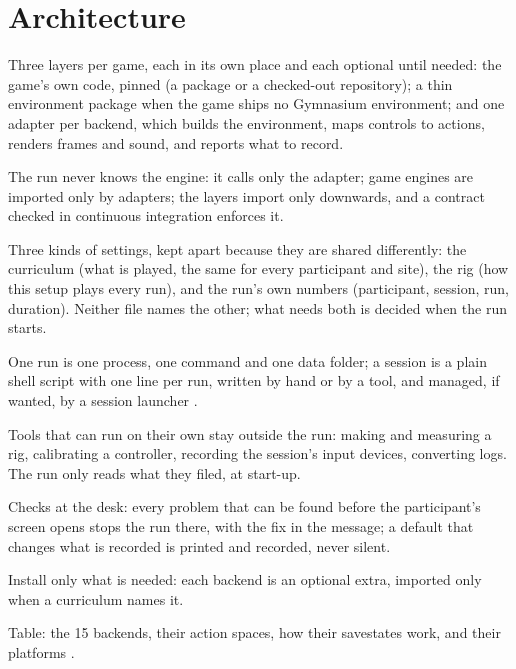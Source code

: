 \section{Architecture}
\label{sec:architecture}

\begin{outline}
  \item Three layers per game, each in its own place and each optional until needed: the game's own code, pinned (a package or a checked-out repository); a thin environment package when the game ships no Gymnasium environment; and one adapter per backend, which builds the environment, maps controls to actions, renders frames and sound, and reports what to record.
  \item The run never knows the engine: it calls only the adapter; game engines are imported only by adapters; the layers import only downwards, and a contract checked in continuous integration enforces it.
  \item Three kinds of settings, kept apart because they are shared differently: the curriculum (what is played, the same for every participant and site), the rig (how this setup plays every run), and the run's own numbers (participant, session, run, duration). Neither file names the other; what needs both is decided when the run starts.
  \item One run is one process, one command and one data folder; a session is a plain shell script with one line per run, written by hand or by a tool, and managed, if wanted, by a session launcher .
  \item Tools that can run on their own stay outside the run: making and measuring a rig, calibrating a controller, recording the session's input devices, converting logs. The run only reads what they filed, at start-up.
  \item Checks at the desk: every problem that can be found before the participant's screen opens stops the run there, with the fix in the message; a default that changes what is recorded is printed and recorded, never silent.
  \item Install only what is needed: each backend is an optional extra, imported only when a curriculum names it.
  \item Table: the 15 backends, their action spaces, how their savestates work, and their platforms .
\end{outline}

